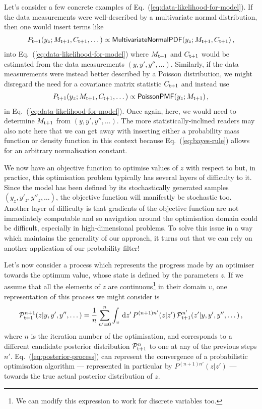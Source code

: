 Let's consider a few concrete examples of Eq.~(\ref{eq:data-likelihood-for-model}). If the data measurements were well-described by a multivariate normal distribution, then one would insert terms like
\begin{align}
P_{{\sf t}+1}(y_z;M_{{\sf t}+1},C_{{\sf t}+1},\dots ) \propto {\sf MultivariateNormalPDF}(y_z;M_{{\sf t}+1},C_{{\sf t}+1})\,,
\end{align}
into Eq.~(\ref{eq:data-likelihood-for-model}) where $M_{{\sf t}+1}$ and $C_{{\sf t}+1}$ would be estimated from the data measurements $(y, y', y'', \dots)$. Similarly, if the data measurements were instead better described by a Poisson distribution, we might disregard the need for a covariance matrix statistic $C_{{\sf t}+1}$ and instead use
\begin{align}
P_{{\sf t}+1}(y_z;M_{{\sf t}+1},C_{{\sf t}+1},\dots ) \propto {\sf PoissonPMF}(y_z;M_{{\sf t}+1})\,,
\end{align}
in Eq.~(\ref{eq:data-likelihood-for-model}). Once again, here, we would need to determine $M_{{\sf t}+1}$ from $(y, y', y'', \dots)$. The more statistically-inclined readers may also note here that we can get away with inserting either a probability mass function or density function in this context because Eq.~(\ref{eq:bayes-rule}) allows for an arbitrary normalisation constant.

We now have an objective function to optimise values of $z$ with respect to but, in practice, this optimisation problem typically has several layers of difficulty to it. Since the model has been defined by its stochastically generated samples $(y_z, y'_z, y''_z, \dots)$, the objective function will manifestly be stochastic too. Another layer of difficulty is that gradients of the objective function are not immediately computable and so navigation around the optimisation domain could be difficult, especially in high-dimensional problems. To solve this issue in a way which maintains the generality of our approach, it turns out that we can rely on another application of our probability filter!

Let's now consider a process which represents the progress made by an optimiser towards the optimum value, whose state is defined by the parameters $z$. If we assume that all the elements of $z$ are continuous\footnote{We can modify this expression to work for discrete variables too.} in their domain $\upsilon$, one representation of this process we might consider is
\begin{align}
{\cal P}^{n+1}_{{\sf t}+1}(z \vert y, y', y'', \dots) = \frac{1}{n}\sum_{n'=0}^n\int_{\upsilon} \,{\rm d}z' \, P^{(n+1)n'}(z\vert z')\, {\cal P}^{n'}_{{\sf t}+1}(z' \vert y, y', y'', \dots) \label{eq:posterior-process} \,,
\end{align}
where $n$ is the iteration number of the optimisation, and corresponds to a different candidate posterior distribution ${\cal P}^{n}_{{\sf t}+1}$ to one at any of the previous steps $n'$. Eq.~(\ref{eq:posterior-process}) can represent the convergence of a probabilistic optimisation algorithm --- represented in particular by $P^{(n+1)n'}(z\vert z')$ --- towards the true actual posterior distribution of $z$. 

